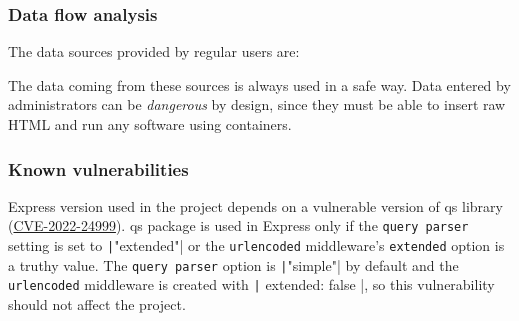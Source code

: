 \subsubsection{Data flow analysis}

The data sources provided by regular users are:

The data coming from these sources is always used in a safe way. Data entered by administrators can be \textit{dangerous} by design, since they must be able to insert raw HTML and run any software using containers.

\subsubsection{Known vulnerabilities}

Express version used in the project depends on a vulnerable version of qs library (\href{https://www.cve.org/CVERecord?id=CVE-2022-24999}{CVE-2022-24999}). qs package is used in Express only if the \texttt{query parser} setting is set to \texttt|"extended"| or the \texttt{urlencoded} middleware's \texttt{extended} option is a truthy value. The \texttt{query parser} option is \texttt|"simple"| by default \cite{bib:express-simple-parser} and the \texttt{urlencoded} middleware is created with \texttt|{ extended: false }|, so this vulnerability should not affect the project.

